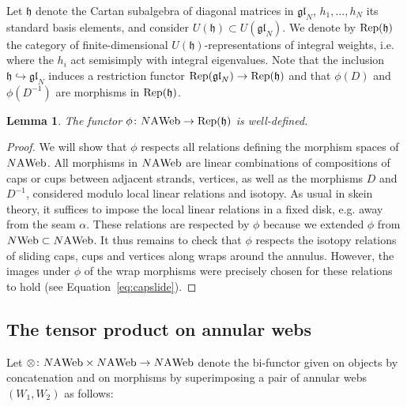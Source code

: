 \documentclass[11pt]{article}
\newtheorem{lemma}[theo]{Lemma}
\theoremstyle{definition}
\numberwithin{equation}{section}
\newcommand{\glnn}[1]{\mf{gl}_{#1}}
\def\mf{\mathfrak}
\newcommand{\reph}{\Rep(\h)}
\def\h{{\mathfrak h}}
\newcommand{\Rep}{\cat{Rep}}
\newcommand{\cat}[1]{\ensuremath{\mbox{\bfseries {\upshape {#1}}}}}
\newcommand{\Web}[1][]{#1\cat{Web}}
\newcommand{\wrap}{D}
\newcommand{\wrapi}{D^{-1}}
\newcommand{\AWeb}[1][]{#1\cat{A}\cat{Web}}
\begin{document}
Let $\h$ denote the Cartan subalgebra of diagonal matrices in $\glnn{N}$,
$h_1,\dots,h_N$ its standard basis elements, and consider $U(\h)\subset
U(\glnn{N})$. We denote by $\reph$ the category of finite-dimensional
$U(\h)$-representations of integral weights, i.e. where the $h_i$ act semisimply
with integral eigenvalues. Note that the inclusion $\h\hookrightarrow \glnn{N}$
induces a restriction functor $\Rep(\glnn{N})\to\reph$ and that $\phi(\wrap)$
and $\phi(\wrapi)$ are morphisms in $\reph$. 


\begin{lemma}\label{lem:welldef} The functor $\phi\colon \AWeb[N] \to \reph$ is well-defined. 
\end{lemma}
\begin{proof} We will show that $\phi$ respects all relations defining the
morphism spaces of $\AWeb[N]$. All morphisms in $\AWeb[N]$ are linear
combinations of compositions of caps or cups between adjacent strands, vertices,
as well as the morphisms $\wrap$ and $\wrapi$, considered modulo local linear
relations and isotopy. As usual in skein theory, it suffices to impose the local
linear relations in a fixed disk, e.g. away from the seam $\alpha$. These
relations are respected by $\phi$ because we extended $\phi$ from
$\Web[N]\subset \AWeb[N]$. It thus remains to check that $\phi$ respects the
isotopy relations of sliding caps, cups and vertices along
wraps around the annulus. However, the images under $\phi$ of the wrap morphisms
were precisely chosen for these relations to hold (see Equation~\eqref{eq:capslide}). 
\end{proof}



\subsection{The tensor product on annular webs}
Let $\otimes\colon \AWeb[N]\times \AWeb[N]\to \AWeb[N]$ denote the bi-functor
given on objects by concatenation and on morphisms by superimposing a pair of
annular webs $(W_1,W_2)$ as follows:
\end{document}
